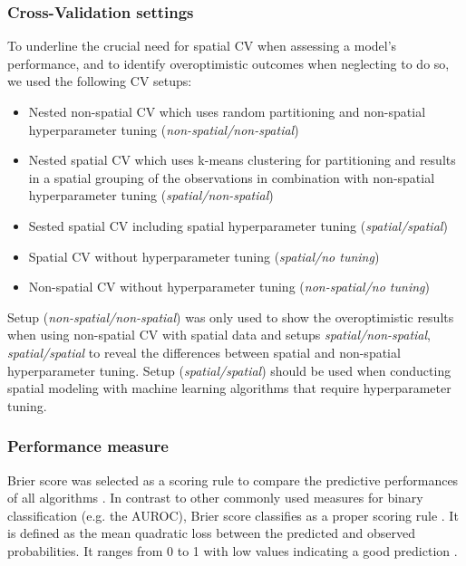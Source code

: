 \documentclass[review]{elsarticle}
\begin{document}
\subsubsection{Cross-Validation settings}

To underline the crucial need for spatial \ac{CV} when assessing a model's performance, and to identify overoptimistic outcomes when neglecting to do so, we used the following CV setups:

\begin{itemize}
	\item Nested non-spatial \ac{CV} which uses random partitioning and non-spatial hyperparameter tuning (\emph{non-spatial/non-spatial})
	\item Nested spatial \ac{CV} which uses k-means clustering for partitioning \citep{Brenning2005} and results in a spatial grouping of the observations in combination with non-spatial hyperparameter tuning (\emph{spatial/non-spatial})
	\item Sested spatial \ac{CV} including spatial hyperparameter tuning (\emph{spatial/spatial}) 
	\item Spatial \ac{CV} without hyperparameter tuning (\emph{spatial/no tuning})
	\item Non-spatial \ac{CV} without hyperparameter tuning (\emph{non-spatial/no tuning})
\end{itemize}

\noindent Setup (\emph{non-spatial/non-spatial}) was only used to show the overoptimistic results when using non-spatial \ac{CV} with spatial data and setups \emph{spatial/non-spatial}, \emph{spatial/spatial} to reveal the differences between spatial and non-spatial hyperparameter tuning.
Setup (\emph{spatial/spatial}) should be used when conducting spatial modeling with machine learning algorithms that require hyperparameter tuning.

\subsubsection{Performance measure}
Brier score was selected as a scoring rule to compare the predictive performances of all algorithms \citep{Brier1950}.
In contrast to other commonly used measures for binary classification (e.g. the \ac{AUROC}), Brier score classifies as a proper scoring rule \citep{Byrne2016, Gneiting2007}.
It is defined as the mean quadratic loss between the predicted and observed probabilities.
It ranges from 0 to 1 with low values indicating a good prediction \citep{Brier1950}.
\end{document}
